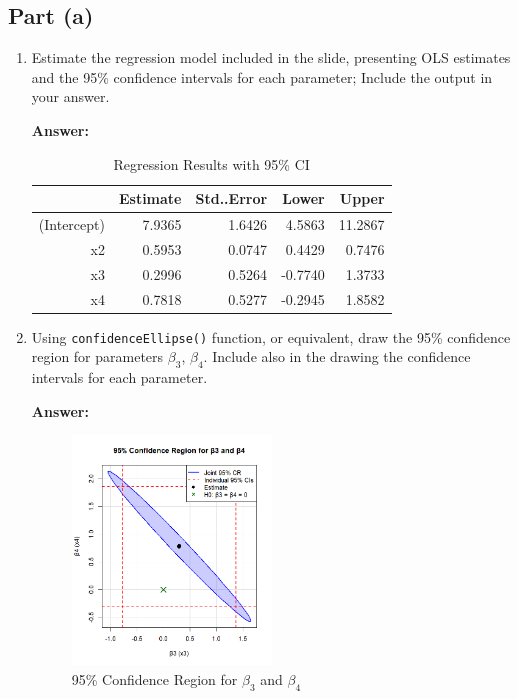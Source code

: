 \documentclass[12pt,a4paper]{article}
\begin{document}
\subsection*{Part (a)}
\begin{enumerate}[label=(\roman*)]
  \item Estimate the regression model included in the slide, presenting OLS estimates and the 95\% confidence intervals for each parameter; Include the output in your answer.
  
  \textbf{Answer:} 
 
\begin{table}[ht]
    \centering
    \caption{Regression Results with 95\% CI} 
    \label{tab:regression}
  \begin{tabular}{rrrrr}
    \hline
    & Estimate & Std..Error & Lower & Upper \\ 
    \hline
    (Intercept) & 7.9365 & 1.6426 & 4.5863 & 11.2867 \\ 
    x2 & 0.5953 & 0.0747 & 0.4429 & 0.7476 \\ 
    x3 & 0.2996 & 0.5264 & -0.7740 & 1.3733 \\ 
    x4 & 0.7818 & 0.5277 & -0.2945 & 1.8582 \\ 
    \hline
  \end{tabular}
\end{table}

  
  \item Using \texttt{confidenceEllipse()} function, or equivalent, draw the 95\% confidence region for parameters $\beta_3$, $\beta_4$. Include also in the drawing the confidence intervals for each parameter.
  
  \textbf{Answer:}


    \begin{figure}[H]  
      \centering
      \includegraphics[width=0.5\textwidth]{Files/q1ii_plot.png}
      \caption{95\% Confidence Region for $\beta_3$ and $\beta_4$}
      \label{fig:ellipse}
    \end{figure}


\end{enumerate}
\end{document}
